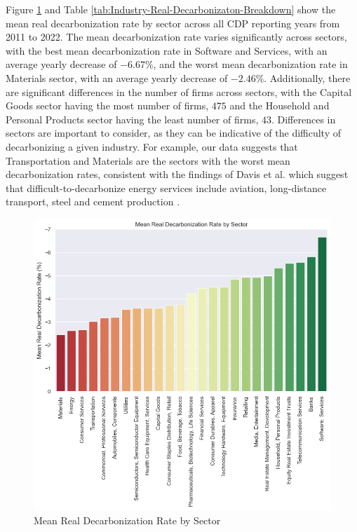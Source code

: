 \noindent Figure \ref{fig:mean-decarbonization-rate-by-sector} and Table \ref{tab:Industry-Real-Decarbonizaton-Breakdown} show the mean real decarbonization rate by sector across all CDP reporting years from 2011 to 2022. The mean decarbonization rate varies significantly across sectors, with the best mean decarbonization rate in Software and Services, with an average yearly decrease of $-6.67 \%$, and the worst mean decarbonization rate in Materials sector, with an average yearly decrease of $-2.46\%$. Additionally, there are significant differences in the number of firms across sectors, with the Capital Goods sector having the most number of firms, $475$ and the Household and Personal Products sector having the least number of firms, $43$. Differences in sectors are important to consider, as they can be indicative of the difficulty of decarbonizing a given industry. For example, our data suggests that Transportation and Materials are the sectors with the worst mean decarbonization rates, consistent with the findings of Davis et al. which suggest that difficult-to-decarbonize energy services include aviation, long-distance transport, steel and cement production \cite{Davis2018Net-zero}.

\begin{figure}[H]
    \begin{center}
    \includegraphics[width=5in]{figures/mean_decarbonization_rate_by_sector.png}
    \caption{Mean Real Decarbonization Rate by Sector}
    \label{fig:mean-decarbonization-rate-by-sector}
    \end{center}
\end{figure}


